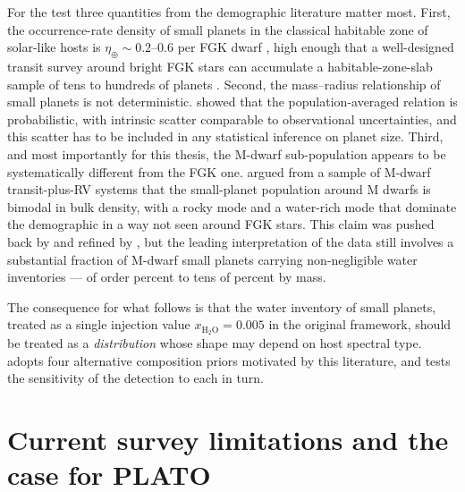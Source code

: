 For the \HZIED test three quantities from the demographic literature
matter most.  First, the occurrence-rate density of small planets in
the classical habitable zone of solar-like hosts is
$\eta_\oplus \sim 0.2$--$0.6$ per FGK dwarf
\parencite{Bryson2021,Kunimoto2020}, high enough that a well-designed
transit survey around bright FGK stars can accumulate a
habitable-zone-slab sample of tens to hundreds of planets
\parencite{Schlecker2024}.  Second, the mass--radius relationship of
small planets is not deterministic.  \textcite{ChenKipping2017}
showed that the population-averaged relation is probabilistic, with
intrinsic scatter comparable to observational uncertainties, and this
scatter has to be included in any statistical inference on planet
size.  Third, and most importantly for this thesis, the M-dwarf
sub-population appears to be systematically different from the FGK
one.  \textcite{LuquePalle2022} argued from a sample of M-dwarf
transit-plus-RV systems that the small-planet population around M
dwarfs is bimodal in bulk density, with a rocky mode and a water-rich
mode that dominate the demographic in a way not seen around FGK
stars.  This claim was pushed back by \textcite{Rogers2023} and
refined by \textcite{Rogers2024}, but the leading interpretation of
the data still involves a substantial fraction of M-dwarf small
planets carrying non-negligible water inventories --- of order
percent to tens of percent by mass.

The consequence for what follows is that the water inventory of small
planets, treated as a single injection value
$x_{\mathrm{H_2O}}=0.005$ in the original \textcite{Schlecker2024}
framework, should be treated as a \emph{distribution} whose shape may
depend on host spectral type.   adopts four
alternative composition priors motivated by this literature, and
 tests the sensitivity of the \HZIED detection to
each in turn.


\section{Current survey limitations and the case for PLATO}
\label{sec:kt_current_surveys}

